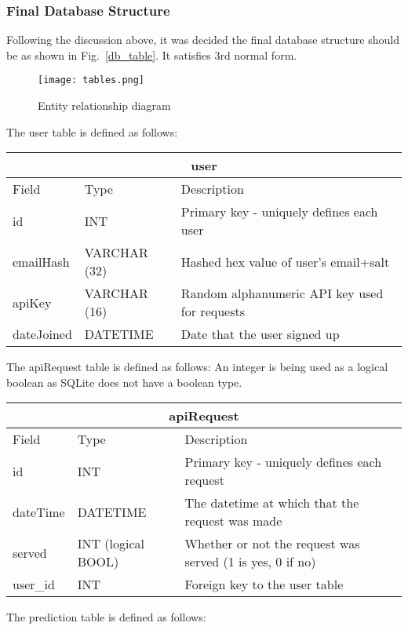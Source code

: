             \subsubsection{Final Database Structure}
            Following the discussion above, it was decided the final database structure should be as shown in Fig.~\ref{db_table}. It satisfies 3rd normal form.

            \begin{figure}[htbp]
                \centering
                \texttt{[image: tables.png]}
                \caption{Entity relationship diagram}
                \label{fig:db_table}
            \end{figure}
            \pagebreak
            The user table is defined as follows:

            \begin{tabular}{|p{2cm}|p{2cm}|p{7cm}|}
                \hline
                \multicolumn{3}{|c|}{user} \\
                \hline
                Field & Type & Description\\
                \hline
                id & INT & Primary key - uniquely defines each user \\
                emailHash & VARCHAR (32) & Hashed hex value of user's email+salt \\
                apiKey & VARCHAR (16) & Random alphanumeric API key used for requests \\
                dateJoined & DATETIME & Date that the user signed up \\
                \hline 
            \end{tabular} 
            \vspace{5mm}\linebreak
            The apiRequest table is defined as follows: An integer is being used as a logical boolean as SQLite does not have a boolean type.
            
            \begin{tabular}{|p{2cm}|p{2cm}|p{7cm}|}
                \hline
                \multicolumn{3}{|c|}{apiRequest} \\
                \hline
                Field & Type & Description \\
                \hline
                id & INT & Primary key - uniquely defines each request \\
                dateTime & DATETIME & The datetime at which that the request was made \\
                served & INT (logical BOOL) & Whether or not the request was served (1 is yes, 0 if no) \\
                user\_id & INT & Foreign key to the user table \\
                \hline
            \end{tabular}
            \vspace{5mm}\linebreak
            The prediction table is defined as follows:

